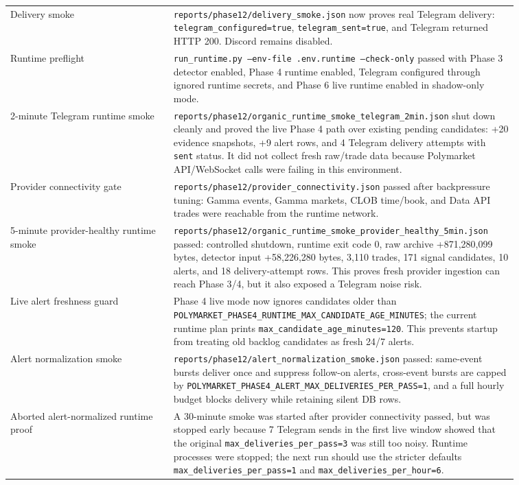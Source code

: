 \documentclass{article}
\begin{document}
\begin{longtable}{p{0.30\linewidth}p{0.56\linewidth}}
Delivery smoke & \texttt{reports/phase12/delivery\_smoke.json} now proves real Telegram delivery: \texttt{telegram\_configured=true}, \texttt{telegram\_sent=true}, and Telegram returned HTTP 200. Discord remains disabled. \\
Runtime preflight & \texttt{run\_runtime.py --env-file .env.runtime --check-only} passed with Phase 3 detector enabled, Phase 4 runtime enabled, Telegram configured through ignored runtime secrets, and Phase 6 live runtime enabled in shadow-only mode. \\
2-minute Telegram runtime smoke & \texttt{reports/phase12/organic\_runtime\_smoke\_telegram\_2min.json} shut down cleanly and proved the live Phase 4 path over existing pending candidates: +20 evidence snapshots, +9 alert rows, and 4 Telegram delivery attempts with \texttt{sent} status. It did not collect fresh raw/trade data because Polymarket API/WebSocket calls were failing in this environment. \\
Provider connectivity gate & \texttt{reports/phase12/provider\_connectivity.json} passed after backpressure tuning: Gamma events, Gamma markets, CLOB time/book, and Data API trades were reachable from the runtime network. \\
5-minute provider-healthy runtime smoke & \texttt{reports/phase12/organic\_runtime\_smoke\_provider\_healthy\_5min.json} passed: controlled shutdown, runtime exit code 0, raw archive +871{,}280{,}099 bytes, detector input +58{,}226{,}280 bytes, 3{,}110 trades, 171 signal candidates, 10 alerts, and 18 delivery-attempt rows. This proves fresh provider ingestion can reach Phase 3/4, but it also exposed a Telegram noise risk. \\
Live alert freshness guard & Phase 4 live mode now ignores candidates older than \texttt{POLYMARKET\_PHASE4\_RUNTIME\_MAX\_CANDIDATE\_AGE\_MINUTES}; the current runtime plan prints \texttt{max\_candidate\_age\_minutes=120}. This prevents startup from treating old backlog candidates as fresh 24/7 alerts. \\
Alert normalization smoke & \texttt{reports/phase12/alert\_normalization\_smoke.json} passed: same-event bursts deliver once and suppress follow-on alerts, cross-event bursts are capped by \texttt{POLYMARKET\_PHASE4\_ALERT\_MAX\_DELIVERIES\_PER\_PASS=1}, and a full hourly budget blocks delivery while retaining silent DB rows. \\
Aborted alert-normalized runtime proof & A 30-minute smoke was started after provider connectivity passed, but was stopped early because 7 Telegram sends in the first live window showed that the original \texttt{max\_deliveries\_per\_pass=3} was still too noisy. Runtime processes were stopped; the next run should use the stricter defaults \texttt{max\_deliveries\_per\_pass=1} and \texttt{max\_deliveries\_per\_hour=6}. \\

\end{longtable}
\end{document}

